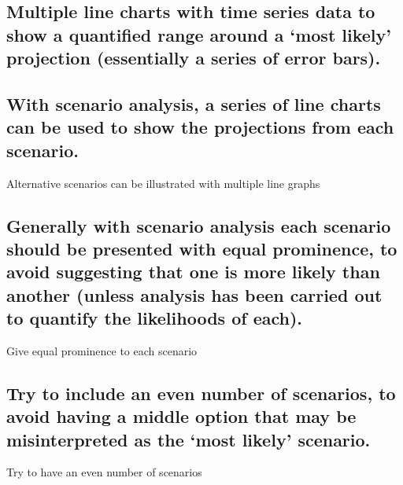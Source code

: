 \documentclass[]{book}
\begin{document}
\subsection{\texorpdfstring{Multiple line charts with time series data
to show a quantified range around a `most likely' projection
(essentially a series of error
bars).}{Multiple line charts with time series data to show a quantified range around a most likely projection (essentially a series of error bars).}}\label{multiple-line-charts-with-time-series-data-to-show-a-quantified-range-around-a-most-likely-projection-essentially-a-series-of-error-bars.}

\subsection{With scenario analysis, a series of line charts can be used
to show the projections from each
scenario.}\label{with-scenario-analysis-a-series-of-line-charts-can-be-used-to-show-the-projections-from-each-scenario.}

Alternative scenarios can be illustrated with multiple line graphs

\subsection{Generally with scenario analysis each scenario should be
presented with equal prominence, to avoid suggesting that one is more
likely than another (unless analysis has been carried out to quantify
the likelihoods of
each).}\label{generally-with-scenario-analysis-each-scenario-should-be-presented-with-equal-prominence-to-avoid-suggesting-that-one-is-more-likely-than-another-unless-analysis-has-been-carried-out-to-quantify-the-likelihoods-of-each.}

Give equal prominence to each scenario

\subsection{\texorpdfstring{Try to include an even number of scenarios,
to avoid having a middle option that may be misinterpreted as the `most
likely'
scenario.}{Try to include an even number of scenarios, to avoid having a middle option that may be misinterpreted as the most likely scenario.}}\label{try-to-include-an-even-number-of-scenarios-to-avoid-having-a-middle-option-that-may-be-misinterpreted-as-the-most-likely-scenario.}

 Try to have an even number of scenarios
\end{document}
